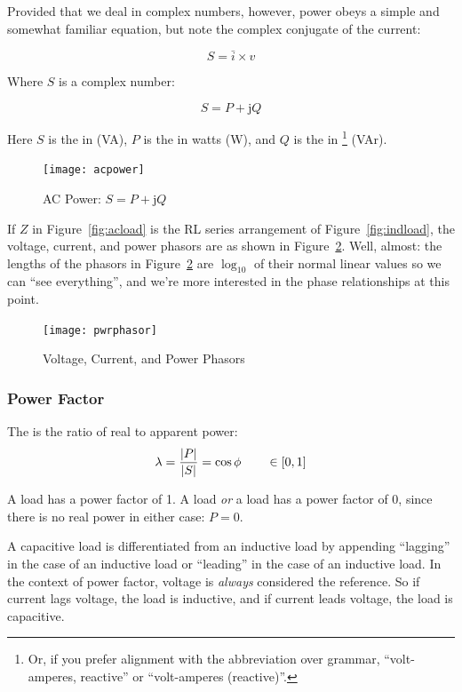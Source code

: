 \documentclass[11pt]{article}
\begin{document}
Provided that we deal in complex numbers, however, power obeys a
simple and somewhat familiar equation, but note the complex conjugate
of the current:

\[
S = \bar{i} \times v
\]

Where $S$ is a complex number:

\[
S = P+\mathrm{j}Q
\]

Here $S$ is the  in 
(\unit{VA}), $P$ is the  in watts (\unit{W}), and $Q$
is the  in \footnote{Or, if you prefer alignment with the
  abbreviation over grammar, ``volt-amperes, reactive'' or
  ``volt-amperes (reactive)''.} (\unit{VAr}).

\begin{figure}[ht]
  \centering
  \texttt{[image: acpower]}
  \caption{AC Power: $S=P+\mathrm{j}Q$}
  \label{fig:acpower}
\end{figure}


If $Z$ in Figure~\ref{fig:acload} is the RL series arrangement of
Figure~\ref{fig:indload}, the voltage, current, and power phasors are
as shown in Figure~\ref{fig:pwrphasor}. Well, almost: the lengths of
the phasors in Figure~\ref{fig:pwrphasor} are $\log_{10}$ of their
normal linear values so we can ``see everything'', and we're more
interested in the phase relationships at this point.

\begin{figure}[ht]
  \centering
  \texttt{[image: pwrphasor]}
  \caption{Voltage, Current, and Power Phasors}
  \label{fig:pwrphasor}
\end{figure}


\subsubsection{Power Factor}

The  is the ratio of real to apparent power:
\[
\lambda = \frac{\lvert P\rvert}{\lvert S\rvert} = \cos\phi \qquad \in [0,1]
\]

A  load has a power factor of 1. A  load \emph{or} a  load has a
power factor of 0, since there is no real power in either case: $P=0$.

A capacitive load is differentiated from an inductive load by
appending ``lagging'' in the case of an inductive load or ``leading''
in the case of an inductive load. In the context of power factor,
voltage is \emph{always} considered the reference. So if current lags
voltage, the load is inductive, and if current leads voltage, the load
is capacitive.
\end{document}

